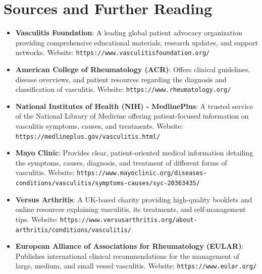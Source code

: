 \section*{Sources and Further Reading}
\begin{itemize}
\item \textbf{Vasculitis Foundation}: A leading global patient advocacy organization providing comprehensive educational materials, research updates, and support networks. Website: \texttt{https://www.vasculitisfoundation.org/}
\item \textbf{American College of Rheumatology (ACR)}: Offers clinical guidelines, disease overviews, and patient resources regarding the diagnosis and classification of vasculitis. Website: \texttt{https://www.rheumatology.org/}
\item \textbf{National Institutes of Health (NIH) - MedlinePlus}: A trusted service of the National Library of Medicine offering patient-focused information on vasculitis symptoms, causes, and treatments. Website: \texttt{https://medlineplus.gov/vasculitis.html/}
\item \textbf{Mayo Clinic}: Provides clear, patient-oriented medical information detailing the symptoms, causes, diagnosis, and treatment of different forms of vasculitis. Website: \texttt{https://www.mayoclinic.org/diseases-conditions/vasculitis/symptoms-causes/syc-20363435/}
\item \textbf{Versus Arthritis}: A UK-based charity providing high-quality booklets and online resources explaining vasculitis, its treatments, and self-management tips. Website: \texttt{https://www.versusarthritis.org/about-arthritis/conditions/vasculitis/}
\item \textbf{European Alliance of Associations for Rheumatology (EULAR)}: Publishes international clinical recommendations for the management of large, medium, and small vessel vasculitis. Website: \texttt{https://www.eular.org/}
\end{itemize}